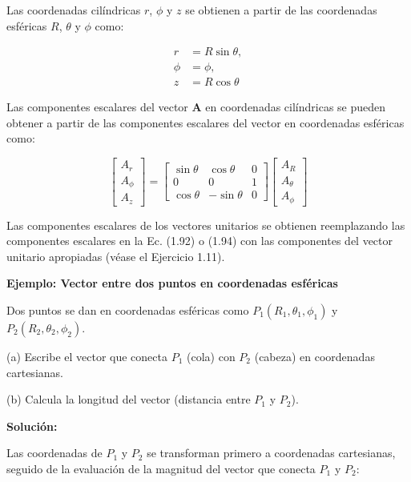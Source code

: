 \documentclass{book}
\begin{document}
Las coordenadas cilíndricas $r$, $\phi$ y $z$ se obtienen a partir de las coordenadas esféricas $R$, $\theta$ y $\phi$ como:

\begin{equation}
\begin{aligned}
r &= R \sin \theta, \\
\phi &= \phi, \\
z &= R \cos \theta
\end{aligned}
\end{equation}

Las componentes escalares del vector $\mathbf{A}$ en coordenadas cilíndricas se pueden obtener a partir de las componentes escalares del vector en coordenadas esféricas como:

\begin{equation}
\begin{bmatrix} A_r \\ A_{\phi} \\ A_z \end{bmatrix} = 
\begin{bmatrix} 
\sin \theta & \cos \theta & 0 \\
0 & 0 & 1 \\
\cos \theta & -\sin \theta & 0 
\end{bmatrix}
\begin{bmatrix} A_R \\ A_{\theta} \\ A_{\phi} \end{bmatrix}
\end{equation}

Las componentes escalares de los vectores unitarios se obtienen reemplazando las componentes escalares en la Ec. (1.92) o (1.94) con las componentes del vector unitario apropiadas (véase el Ejercicio 1.11).

\textbf{Ejemplo: Vector entre dos puntos en coordenadas esféricas}

Dos puntos se dan en coordenadas esféricas como $P_1(R_1, \theta_1, \phi_1)$ y $P_2(R_2, \theta_2, \phi_2)$.

(a) Escribe el vector que conecta $P_1$ (cola) con $P_2$ (cabeza) en coordenadas cartesianas.

(b) Calcula la longitud del vector (distancia entre $P_1$ y $P_2$).

\textbf{Solución:}

Las coordenadas de $P_1$ y $P_2$ se transforman primero a coordenadas cartesianas, seguido de la evaluación de la magnitud del vector que conecta $P_1$ y $P_2$:
\end{document}
